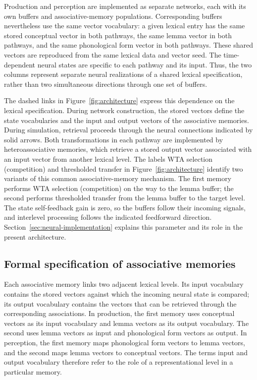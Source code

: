 Production and perception are implemented as separate networks, each with its own buffers and associative-memory populations. Corresponding buffers nevertheless use the same vector vocabulary: a given lexical entry has the same stored conceptual vector in both pathways, the same lemma vector in both pathways, and the same phonological form vector in both pathways. These shared vectors are reproduced from the same lexical data and vector seed. The time-dependent neural states are specific to each pathway and its input. Thus, the two columns represent separate neural realizations of a shared lexical specification, rather than two simultaneous directions through one set of buffers.

The dashed links in Figure~\ref{fig:architecture} express this dependence on the lexical specification. During network construction, the stored vectors define the state vocabularies and the input and output vectors of the associative memories. During simulation, retrieval proceeds through the neural connections indicated by solid arrows. Both transformations in each pathway are implemented by heteroassociative memories, which retrieve a stored output vector associated with an input vector from another lexical level. The labels WTA selection (competition) and thresholded transfer in Figure~\ref{fig:architecture} identify two variants of this common associative-memory mechanism. The first memory performs WTA selection (competition) on the way to the lemma buffer; the second performs thresholded transfer from the lemma buffer to the target level. The state self-feedback gain is zero, so the buffers follow their incoming signals, and interlevel processing follows the indicated feedforward direction. Section~\ref{sec:neural-implementation} explains this parameter and its role in the present architecture.

\subsection{Formal specification of associative memories}
Each associative memory links two adjacent lexical levels. Its input vocabulary contains the stored vectors against which the incoming neural state is compared; its output vocabulary contains the vectors that can be retrieved through the corresponding associations. In production, the first memory uses conceptual vectors as its input vocabulary and lemma vectors as its output vocabulary. The second uses lemma vectors as input and phonological form vectors as output. In perception, the first memory maps phonological form vectors to lemma vectors, and the second maps lemma vectors to conceptual vectors. The terms input and output vocabulary therefore refer to the role of a representational level in a particular memory.

